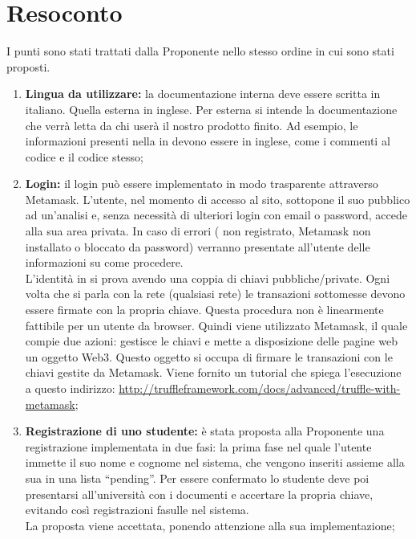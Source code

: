 \documentclass[VER-2017-11-22.tex]{subfiles}
\begin{document}
\chapter{Resoconto}
I punti sono stati trattati dalla Proponente nello stesso ordine in cui sono stati proposti.
\begin{enumerate}
	\item \textbf{Lingua da utilizzare:} la documentazione interna deve essere scritta in italiano. Quella esterna in inglese. Per esterna si intende la documentazione che verrà letta da chi userà il nostro prodotto finito. Ad esempio, le informazioni presenti nella  in  devono essere in inglese, come i commenti al codice e il codice stesso;
	\item \textbf{Login:} il login può essere implementato in modo trasparente attraverso Metamask. L’utente, nel momento di accesso al sito, sottopone il suo  pubblico ad un'analisi e, senza necessità di ulteriori login con email o password, accede alla sua area privata. In caso di errori ( non registrato, Metamask non installato o bloccato da password) verranno presentate all'utente delle informazioni su come procedere.\\	
	L'identità in  si prova avendo una coppia di chiavi pubbliche/private. Ogni volta che si parla con la rete  (qualsiasi rete) le transazioni sottomesse devono essere firmate con la propria chiave. Questa procedura non è linearmente fattibile per un utente da browser. Quindi viene utilizzato Metamask, il quale compie due azioni: gestisce le chiavi e mette a disposizione delle pagine web un oggetto Web3. Questo oggetto si occupa di firmare le transazioni con le chiavi gestite da Metamask. Viene fornito un tutorial che spiega l'esecuzione a questo indirizzo: \href{http://truffleframework.com/docs/advanced/truffle-with-metamask}{http://truffleframework.com/docs/advanced/truffle-with-metamask};
	
	\item \textbf{Registrazione di uno studente:} è stata proposta alla Proponente una registrazione implementata in due fasi: la prima fase nel quale l’utente immette il suo nome e cognome nel sistema, che vengono inseriti assieme alla sua  in una lista “pending”. Per essere confermato lo studente deve poi presentarsi all’università con i documenti e accertare la propria chiave, evitando così registrazioni fasulle nel sistema.\\	
	La proposta viene accettata, ponendo attenzione alla sua implementazione;
	

\end{enumerate}
\end{document}
